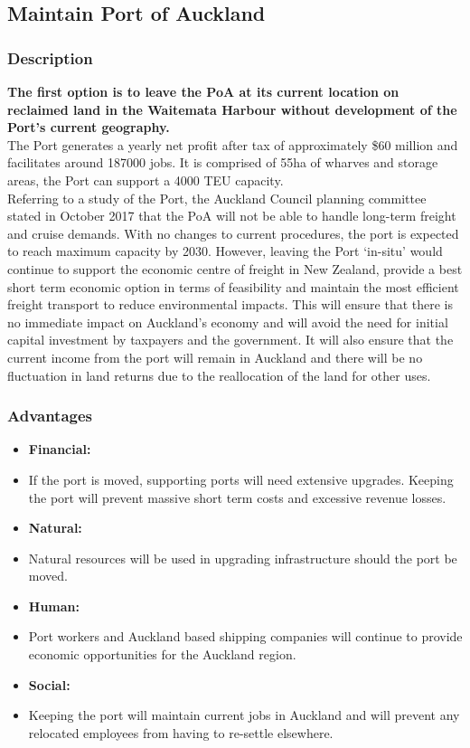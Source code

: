 \begin{multicols}{2}
\subsection*{Maintain Port of Auckland}
    \subsubsection*{Description}
    \textbf{The first option is to leave the PoA at its current location on reclaimed land in the Waitemata Harbour without development of the Port’s current geography.} \\The Port generates a yearly net profit after tax of approximately \$60 million and facilitates around 187000 jobs. It is comprised of 55ha of wharves and storage areas, the Port can support a 4000 TEU capacity.
    \\Referring to a study of the Port, the Auckland Council planning committee stated in October 2017 that the PoA will not be able to handle long-term freight and cruise demands. With no changes to current procedures, the port is expected to reach maximum capacity by 2030. However, leaving the Port ‘in-situ’ would continue to support the economic centre of freight in New Zealand, provide a best short term economic option in terms of feasibility and maintain the most efficient freight transport to reduce environmental impacts. This will ensure that there is no immediate impact on Auckland's economy and will avoid the need for initial capital investment by taxpayers and the government. It will also ensure that the current income from the port will remain in Auckland and there will be no fluctuation in land returns due to the reallocation of the land for other uses.

    \subsubsection*{Advantages}
    \begin{itemize}[noitemsep]
        \item []\textbf{Financial: }
        \item{If the port is moved, supporting ports will need extensive upgrades. Keeping the port will prevent massive short term costs and excessive revenue losses.}
        \item []\textbf{Natural: }
        \item{Natural resources will be used in upgrading infrastructure should the port be moved.}
        \item []\textbf{Human: }
        \item{Port workers and Auckland based shipping companies will continue to provide economic opportunities for the Auckland region.}
        \item []\textbf{Social: }
        \item{Keeping the port will maintain current jobs in Auckland and will prevent any relocated employees from having to re-settle elsewhere.}
    \end{itemize}

\end{multicols}

